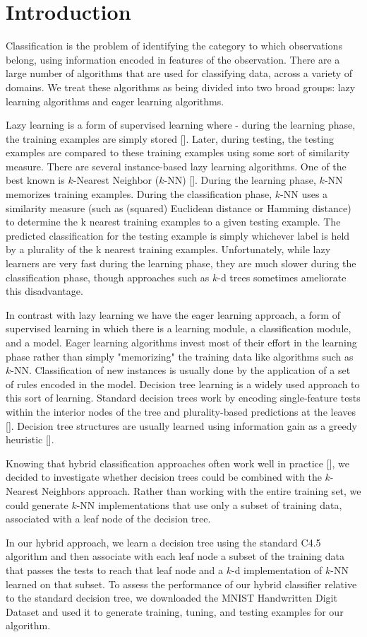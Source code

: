 \section{Introduction}
Classification is the problem of identifying the category to which observations belong, using information encoded in features of the observation. There are a large number of algorithms that are used for classifying data, across a variety of domains.  We treat these algorithms as being divided into two broad groups: lazy learning algorithms and eager learning algorithms.

Lazy learning is a form of supervised learning where - during the learning phase, the training examples are simply stored [].  Later, during testing, the testing examples are compared to these training examples using some sort of similarity measure.  There are several instance-based lazy learning algorithms. One of the best known is $k$-Nearest Neighbor ($k$-NN) []. During the learning phase, $k$-NN memorizes training examples. During the classification phase, $k$-NN uses a similarity measure (such as (squared) Euclidean distance or Hamming distance) to determine the k nearest training examples to a given testing example.  The predicted classification for the testing example is simply whichever label is held by a plurality of the k nearest training examples.  Unfortunately, while lazy learners are very fast during the learning phase, they are much slower during the classification phase, though approaches such as $k$-d trees sometimes ameliorate this disadvantage.

In contrast with lazy learning we have the eager learning approach, a form of supervised learning in which there is a learning module, a classification module, and a model. Eager learning algorithms invest most of their effort in the learning phase rather than simply "memorizing" the training data like algorithms such as $k$-NN. Classification of new instances is usually done by the application of a set of rules encoded in the model. Decision tree learning is a widely used approach to this sort of learning. Standard decision trees work by encoding single-feature tests within the interior nodes of the tree and plurality-based predictions at the leaves [].  Decision tree structures are usually learned using information gain as a greedy heuristic [].

Knowing that hybrid classification approaches often work well in practice [], we decided to investigate whether decision trees could be combined with the $k$-Nearest Neighbors approach.  Rather than working with the entire training set, we could generate $k$-NN implementations that use only a subset of training data, associated with a leaf node of the decision tree.

In our hybrid approach, we learn a decision tree using the standard C4.5 algorithm and then associate with each leaf node a subset of the training data that passes the tests to reach that leaf node and a $k$-d implementation of $k$-NN learned on that subset. To assess the performance of our hybrid classifier relative to the standard decision tree, we downloaded the MNIST Handwritten Digit Dataset \cite{MNISTDatabase} and used it to generate training, tuning, and testing examples for our algorithm.
